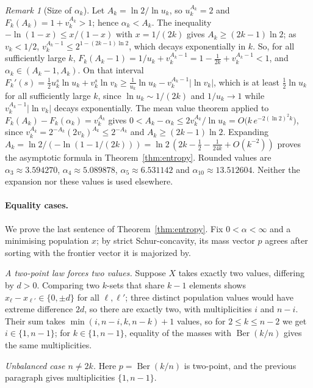 \documentclass[11pt]{article}
\theoremstyle{remark}
\newtheorem{remark}[theorem]{Remark}
\newcommand{\Ber}{\operatorname{Ber}}
\begin{document}
\begin{remark}[Size of \(\alpha_k\)]\label{rem:asymp}
Let \(A_k=\ln2/\ln u_k\), so \(u_k^{A_k}=2\) and \(F_k(A_k)=1+v_k^{A_k}>1\);
hence \(\alpha_k<A_k\). The inequality \(-\ln(1-x)\le x/(1-x)\) with
\(x=1/(2k)\) gives \(A_k\ge(2k-1)\ln2\); as \(v_k<1/2\),
\(v_k^{A_k-1}\le2^{1-(2k-1)\ln2}\), which decays exponentially in \(k\). So,
for all sufficiently large \(k\),
\(F_k(A_k-1)=1/u_k+v_k^{A_k-1}=1-\frac1{2k}+v_k^{A_k-1}<1\), and
\(\alpha_k\in(A_k-1,A_k)\). On that interval
\(F_k'(s)=\tfrac12u_k^s\ln u_k+v_k^s\ln v_k\ge\tfrac1{u_k}\ln u_k-v_k^{A_k-1}|\ln v_k|\),
which is at least \(\tfrac12\ln u_k\) for all sufficiently large \(k\), since
\(\ln u_k\sim1/(2k)\) and \(1/u_k\to1\) while \(v_k^{A_k-1}|\ln v_k|\) decays
exponentially. The
mean value theorem applied to \(F_k(A_k)-F_k(\alpha_k)=v_k^{A_k}\) gives
\(0<A_k-\alpha_k\le2v_k^{A_k}/\ln u_k=O\bigl(k\,e^{-2(\ln2)^2k}\bigr)\), since
\(v_k^{A_k}=2^{-A_k}(2v_k)^{A_k}\le2^{-A_k}\) and \(A_k\ge(2k-1)\ln2\). Expanding
\(A_k=\ln2/(-\ln(1-1/(2k)))=\ln2\,(2k-\tfrac12-\tfrac1{24k}+O(k^{-2}))\) proves
the asymptotic formula in Theorem~\ref{thm:entropy}. Rounded values are
\(\alpha_3\approx3.594270\), \(\alpha_4\approx5.089878\),
\(\alpha_5\approx6.531142\) and \(\alpha_{10}\approx13.512604\). Neither the
expansion nor these values is used elsewhere.
\end{remark}

\paragraph{Equality cases.} We prove the last sentence of
Theorem~\ref{thm:entropy}. Fix \(0<\alpha<\infty\) and a minimising population
\(x\); by strict Schur-concavity, its mass vector \(p\) agrees after sorting
with the frontier vector it is majorized by.

\emph{A two-point law forces two values.} Suppose \(X\) takes exactly two
values, differing by \(d>0\). Comparing two \(k\)-sets that share \(k-1\)
elements shows \(x_\ell-x_{\ell'}\in\{0,\pm d\}\) for all \(\ell,\ell'\); three
distinct population values would have extreme difference \(2d\), so there are
exactly two, with multiplicities \(i\) and \(n-i\). Their sum takes
\(\min(i,n-i,k,n-k)+1\) values, so for \(2\le k\le n-2\) we get
\(i\in\{1,n-1\}\); for \(k\in\{1,n-1\}\), equality of the masses with
\(\Ber(k/n)\) gives the same multiplicities.

\emph{Unbalanced case \(n\ne2k\).} Here \(p=\Ber(k/n)\) is two-point, and the
previous paragraph gives multiplicities \(\{1,n-1\}\).
\end{document}

